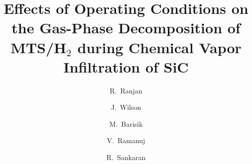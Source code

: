 \documentclass[final, letterpaper, square, comma, numbers, sort&compress]{elsarticle}
\begin{document}
\begin{frontmatter}

\title{Effects of Operating Conditions on the Gas-Phase Decomposition of \\ MTS/H$_2$ during Chemical Vapor Infiltration of SiC}

\author[1]{R.~Ranjan}
\author[1]{J.~Wilson}
\author[1]{M.~Barisik}
\author[2]{V.~Ramanuj}
\author[2]{R.~Sankaran}

\address[1]{Department of Mechanical Engineering, The University of Tennessee Chattanooga \\
615 McCallie Avenue, Chattanooga, TN 37403, USA}
\address[2]{Computational Sciences and Engineering Division, Oak Ridge National Laboratory \\
1 Bethel Valley Rd., Oak Ridge, TN 37831, USA}


\end{frontmatter}
\end{document}
